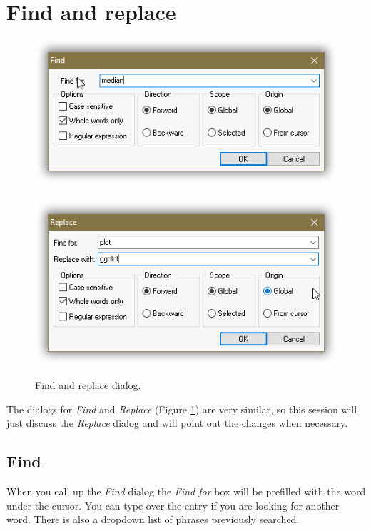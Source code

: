 
\hypertarget{working_findreplace}{}
\section{Find and replace}

\begin{figure}[H]
  \includegraphics[scale=0.35]{./res/find.png}~~
  \includegraphics[scale=0.35]{./res/replace.png}\\
  \caption{Find and replace dialog.}
  \label{fig:find_replace}
\end{figure}

The dialogs for \textit{Find}
and \textit{Replace}
(Figure \ref{fig:find_replace})
are very similar, so this session will just discuss the \textit{Replace} dialog
and will point out the changes when necessary.


\subsection{Find}

When you call up the \textit{Find} dialog
the \textit{Find for} box will be
prefilled with the word under the cursor. You can type over the entry if you
are looking for another word. There is also a dropdown list of phrases
previously searched.



